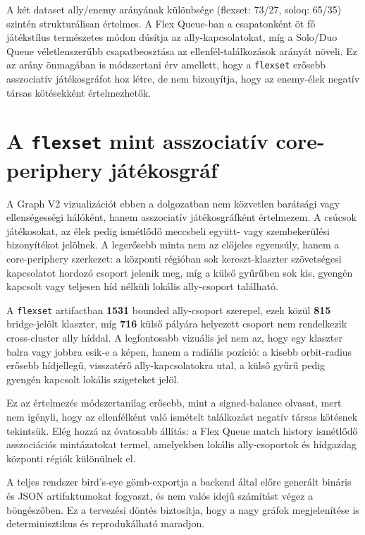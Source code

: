 ﻿\documentclass[a4paper,12pt]{report}
\begin{document}
A két dataset ally/enemy arányának különbsége (flexset: 73/27, soloq: 65/35) szintén strukturálisan értelmes. A Flex Queue-ban a csapatonként öt fő játékstílus természetes módon dúsítja az ally-kapcsolatokat, míg a Solo/Duo Queue véletlenszerűbb csapatbeosztása az ellenfél-találkozások arányát növeli. Ez az arány önmagában is módszertani érv amellett, hogy a \texttt{flexset} erősebb asszociatív játékosgráfot hoz létre, de nem bizonyítja, hogy az enemy-élek negatív társas kötésekként értelmezhetők.

\section{A \texttt{flexset} mint asszociatív core-periphery játékosgráf}

A Graph V2 vizualizációt ebben a dolgozatban nem közvetlen barátsági vagy ellenségességi hálóként, hanem asszociatív játékosgráfként értelmezem. A csúcsok játékosokat, az élek pedig ismétlődő meccsbeli együtt- vagy szembekerülési bizonyítékot jelölnek. A legerősebb minta nem az előjeles egyensúly, hanem a core-periphery szerkezet: a központi régióban sok kereszt-klaszter szövetségesi kapcsolatot hordozó csoport jelenik meg, míg a külső gyűrűben sok kis, gyengén kapcsolt vagy teljesen híd nélküli lokális ally-csoport található.

A \texttt{flexset} artifactban \textbf{1531} bounded ally-csoport szerepel, ezek közül \textbf{815} bridge-jelölt klaszter, míg \textbf{716} külső pályára helyezett csoport nem rendelkezik cross-cluster ally híddal. A legfontosabb vizuális jel nem az, hogy egy klaszter balra vagy jobbra esik-e a képen, hanem a radiális pozíció: a kisebb orbit-radius erősebb hídjellegű, visszatérő ally-kapcsolatokra utal, a külső gyűrű pedig gyengén kapcsolt lokális szigeteket jelöl.

Ez az értelmezés módszertanilag erősebb, mint a signed-balance olvasat, mert nem igényli, hogy az ellenfélként való ismételt találkozást negatív társas kötésnek tekintsük. Elég hozzá az óvatosabb állítás: a Flex Queue match history ismétlődő asszociációs mintázatokat termel, amelyekben lokális ally-csoportok és hídgazdag központi régiók különülnek el.

A teljes rendszer bird's-eye gömb-exportja a backend által előre generált bináris és JSON artifaktumokat fogyaszt, és nem valós idejű számítást végez a böngészőben. Ez a tervezési döntés biztosítja, hogy a nagy gráfok megjelenítése is determinisztikus és reprodukálható maradjon.
\end{document}

